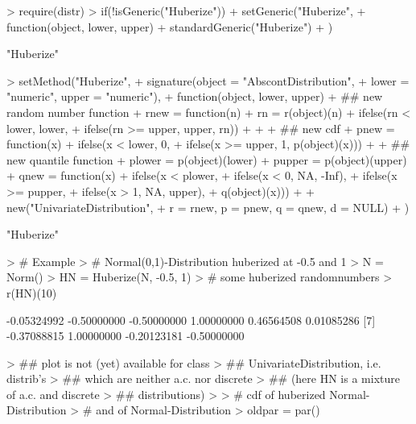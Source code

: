 \documentclass[11pt]{article}
\begin{document}
\begin{Schunk}
\begin{Sinput}
> require(distr)
> if(!isGeneric("Huberize")) 
+     setGeneric("Huberize", 
+        function(object, lower, upper) 
+                 standardGeneric("Huberize")
+                 )
\end{Sinput}
\begin{Soutput}
[1] "Huberize"
\end{Soutput}
\begin{Sinput}
> setMethod("Huberize",
+           signature(object = "AbscontDistribution", 
+           lower = "numeric", upper = "numeric"),
+           function(object, lower, upper){
+             ## new random number function
+             rnew = function(n){
+               rn = r(object)(n)
+               ifelse(rn < lower, lower, 
+                      ifelse(rn >= upper, upper, rn))
+             }
+ 
+             ## new cdf 
+             pnew = function(x)
+               ifelse(x < lower, 0, 
+                      ifelse(x >= upper, 1, p(object)(x)))
+ 
+             ## new quantile function
+             plower = p(object)(lower)
+             pupper = p(object)(upper)
+             qnew = function(x)
+               ifelse(x < plower,
+                      ifelse(x < 0, NA, -Inf),
+                      ifelse(x >= pupper,
+                             ifelse(x > 1, NA, upper),
+                             q(object)(x)))
+ 
+             new("UnivariateDistribution",
+                 r = rnew, p = pnew, q = qnew, d = NULL)
+           })
\end{Sinput}
\begin{Soutput}
[1] "Huberize"
\end{Soutput}
\begin{Sinput}
> # Example
> # Normal(0,1)-Distribution huberized at -0.5 and 1
> N = Norm()
> HN = Huberize(N, -0.5, 1)
> # some huberized randomnumbers
> r(HN)(10)
\end{Sinput}
\begin{Soutput}
 [1] -0.05324992 -0.50000000 -0.50000000  1.00000000  0.46564508  0.01085286
 [7] -0.37088815  1.00000000 -0.20123181 -0.50000000
\end{Soutput}
\begin{Sinput}
> ## plot is not (yet) available for class
> ## UnivariateDistribution, i.e. distrib's
> ## which are neither a.c. nor discrete 
> ## (here HN is a mixture of a.c. and discrete 
> ## distributions)
> 
> # cdf of huberized Normal-Distribution
> # and of Normal-Distribution
> oldpar = par()

\end{Sinput}
\end{Schunk}
\end{document}
